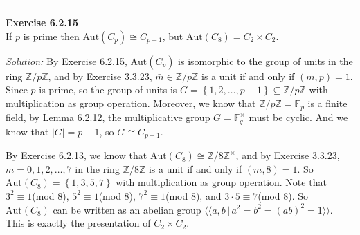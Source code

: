 \documentclass[a4paper, 12pt]{article}
\newenvironment{problem}[2][Exercise]
    { \begin{mdframed}[backgroundcolor=gray!20] \textbf{#1 #2} \\}
    {  \end{mdframed}}
\newenvironment{solution}
    {\textit{Solution:}}
    {}
\begin{document}
\noindent\rule{7in}{2.8pt}
\begin{problem}{6.2.15}
If \(p\) is prime then \(\text{Aut}(C_p)\cong C_{p-1}\), but \(\text{Aut}(C_8)=C_2\times C_2\).
\end{problem}
\begin{solution}
By Exercise 6.2.15, \(\text{Aut}(C_p)\) is isomorphic to the group of units in the ring \(\mathbb{Z}/ p \mathbb{Z}\), and by Exercise 3.3.23, \(\bar{m}\in \mathbb{Z}/ p \mathbb{Z}\) 
is a unit if and only if \((m,p)=1\). Since \(p\) is prime, so the group of units is \(G=\left\{ 1,2,\ldots,p-1 \right\}\subseteq \mathbb{Z}/ p \mathbb{Z}\) with multiplication as group operation. 
Moreover, we know that \(\mathbb{Z}/p \mathbb{Z}=\mathbb{F}_p\) is a finite field, by Lemma 6.2.12, the multiplicative group \(G=\mathbb{F}_q^\times\) must be cyclic. And we know that \(|G|=p-1\), so 
\(G\cong C_{p-1}\).

By Exercise 6.2.13, we know that \(\text{Aut}(C_8)\cong \mathbb{Z}/ 8 \mathbb{Z}^\times\), and by Exercise 3.3.23, \(m=0,1,2,\ldots,7\) in the ring \(\mathbb{Z}/ 8 \mathbb{Z}\) is a unit if and only if 
\((m,8)=1\). So \(\text{Aut}(C_8)=\left\{ 1,3,5,7 \right\}\) with multiplication as group operation. Note that \(3^2\equiv 1\)(mod \(8\)), \(5^2\equiv 1\)(mod \(8\)), \(7^2\equiv 1\)(mod \(8\)), and \(3\cdot 5\equiv 7\)(mod \(8\)). So 
\(\text{Aut}(C_8)\) can be written as an abelian group \(\langle \langle a,b\,|\, a^2=b^2=(ab)^2=1\rangle \rangle\). This is exactly the presentation of \(C_2\times C_2\).
\end{solution}
\end{document}
